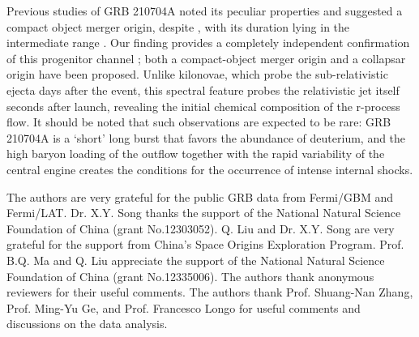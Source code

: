 \documentclass[linenumbers,twocolumn]{aastex631}
\providecommand{\DIFaddtex}[1]{{\protect\color{blue} \sf #1}} %
\providecommand{\DIFdeltex}[1]{{\protect\color{red} \scriptsize #1}} %
\providecommand{\DIFaddbegin}{} %
\providecommand{\DIFaddend}{} %
\providecommand{\DIFdelbegin}{} %
\providecommand{\DIFdelend}{} %
\providecommand{\DIFadd}[1]{\texorpdfstring{\DIFaddtex{#1}}{#1}} %
\providecommand{\DIFdel}[1]{\texorpdfstring{\DIFdeltex{#1}}{}} %
\begin{document}
Previous studies of GRB 210704A noted its peculiar properties\DIFdelbegin \DIFdel{and suggested a compact object merger origin, despite }\DIFdelend \DIFaddbegin \DIFadd{, with }\DIFaddend its duration lying in the intermediate range\DIFdelbegin \DIFdel{\citep{2021GCN.30380....1M, 2023MNRAS.522.5204B}. Our finding provides a completely independent confirmation of this progenitor channel}\DIFdelend \DIFaddbegin \DIFadd{; both a compact-object merger origin \citep{2021GCN.30380....1M, 2023MNRAS.522.5204B} and a collapsar origin \citep{2026MNRAS.548ag555P} have been proposed}\DIFaddend . Unlike kilonovae, which probe the sub-relativistic ejecta days after the event, this spectral feature probes the relativistic jet itself seconds after launch, revealing the initial chemical composition of the r-process flow. \DIFaddbegin \DIFadd{It should be noted that such observations are expected to be rare: GRB 210704A is a `short' long burst that favors the abundance of deuterium, and the high baryon loading of the outflow together with the rapid variability of the central engine creates the conditions for the occurrence of intense internal shocks.
}\DIFaddend %
\begin{acknowledgements}
 The authors are very grateful for the public GRB data from Fermi/GBM and Fermi/LAT. Dr. X.Y. Song thanks the support of the National Natural Science Foundation of China (grant No.12303052). Q. Liu and Dr. X.Y. Song are very grateful for the support from China's Space Origins Exploration Program. Prof. B.Q. Ma and Q. Liu appreciate the support of the National Natural Science Foundation of China (grant No.12335006). The authors thank anonymous reviewers for their useful comments. The authors thank Prof. Shuang-Nan Zhang, Prof. Ming-Yu Ge, and Prof. Francesco Longo for useful comments and discussions on the data analysis.
\end{acknowledgements}
\appendix
\end{document}
